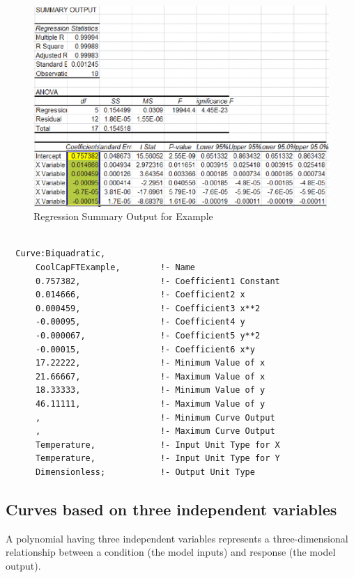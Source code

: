 \begin{figure}[htbp]
\centering
\includegraphics{media/image7867.png}
\caption{Regression Summary Output for Example}
\end{figure}

\begin{lstlisting}

  Curve:Biquadratic,
      CoolCapFTExample,        !- Name
      0.757382,                !- Coefficient1 Constant
      0.014666,                !- Coefficient2 x
      0.000459,                !- Coefficient3 x**2
      -0.00095,                !- Coefficient4 y
      -0.000067,               !- Coefficient5 y**2
      -0.00015,                !- Coefficient6 x*y
      17.22222,                !- Minimum Value of x
      21.66667,                !- Maximum Value of x
      18.33333,                !- Minimum Value of y
      46.11111,                !- Maximum Value of y
      ,                        !- Minimum Curve Output
      ,                        !- Maximum Curve Output
      Temperature,             !- Input Unit Type for X
      Temperature,             !- Input Unit Type for Y
      Dimensionless;           !- Output Unit Type
\end{lstlisting}

\subsection{Curves based on three independent variables}\label{curves-based-on-three-independent-variables}

A polynomial having three independent variables represents a three-dimensional relationship between a condition (the model inputs) and response (the model output).

